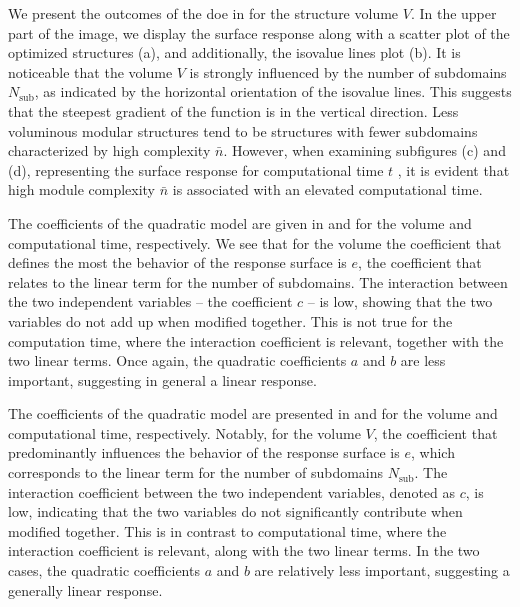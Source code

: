 We present the outcomes of the \gls{doe} in  for the structure volume $V$. In the upper part of the image, we display the surface response along with a scatter plot of the optimized structures (a), and additionally, the isovalue lines plot (b). It is noticeable that the volume $V$ is strongly influenced by the number of subdomains $N_\text{sub}$, as indicated by the horizontal orientation of the isovalue lines. This suggests that the steepest gradient of the function is in the vertical direction. Less voluminous modular structures tend to be structures with fewer subdomains characterized by high complexity $\bar{n}$. However, when examining subfigures (c) and (d), representing the surface response for computational time $t$ , it is evident that high module complexity $\bar{n}$ is associated with an elevated computational time.

The coefficients of the quadratic model are given in  and  for the volume and computational time, respectively. We see that for the volume the coefficient that defines the most the behavior of the response surface is $e$, the coefficient that relates to the linear term for the number of subdomains. The interaction between the two independent variables -- the coefficient $c$ -- is low, showing that the two variables do not add up when modified together. This is not true for the computation time, where the interaction coefficient is relevant, together with the two linear terms. Once again, the quadratic coefficients $a$ and $b$ are less important, suggesting in general a linear response.

The coefficients of the quadratic model are presented in  and  for the volume and computational time, respectively. Notably, for the volume $V$, the coefficient that predominantly influences the behavior of the response surface is $e$, which corresponds to the linear term for the number of subdomains $N_\text{sub}$. The interaction coefficient between the two independent variables, denoted as $c$, is low, indicating that the two variables do not significantly contribute when modified together. This is in contrast to computational time, where the interaction coefficient is relevant, along with the two linear terms. In the two cases, the quadratic coefficients $a$ and $b$ are relatively less important, suggesting a generally linear response.

